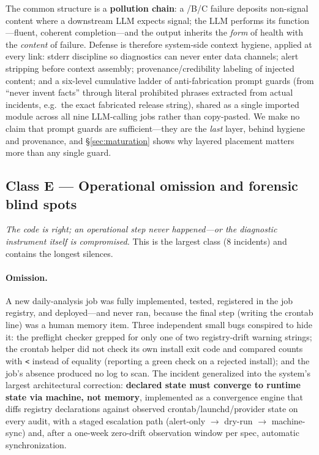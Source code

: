 \medskip
The common structure is a \textbf{pollution chain}: a /B/C
failure deposits non-signal content where a downstream LLM expects
signal; the LLM performs its function---fluent, coherent completion---and
the output inherits the \emph{form} of health with the \emph{content} of
failure. Defense is therefore system-side context hygiene, applied at
every link: stderr discipline so diagnostics can never enter data
channels; alert stripping before context assembly;
provenance/credibility labeling of injected content; and a six-level
cumulative ladder of anti-fabrication prompt guards (from ``never invent
facts'' through literal prohibited phrases extracted from actual
incidents, e.g.\ the exact fabricated release string), shared as a single
imported module across all nine LLM-calling jobs rather than copy-pasted.
We make no claim that prompt guards are sufficient---they are the
\emph{last} layer, behind hygiene and provenance, and
\S\ref{sec:maturation} shows why layered placement matters more than any
single guard.

\subsection{Class E --- Operational omission and forensic blind
spots}\label{sec:classe}

\emph{The code is right; an operational step never happened---or the
diagnostic instrument itself is compromised.} This is the largest class
(8 incidents) and contains the longest silences.

\paragraph{Omission.} A new daily-analysis job was fully implemented,
tested, registered in the job registry, and deployed---and never ran,
because the final step (writing the crontab line) was a human memory
item. Three independent small bugs conspired to hide it: the preflight
checker grepped for only one of two registry-drift warning strings; the
crontab helper did not check its own install exit code and compared
counts with \texttt{<} instead of equality (reporting a green check on a
rejected install); and the job's absence produced no log to scan. The
incident generalized into the system's largest architectural correction:
\textbf{declared state must converge to runtime state via machine, not
memory}, implemented as a convergence engine that diffs registry
declarations against observed crontab/launchd/provider state on every
audit, with a staged escalation path (alert-only $\rightarrow$ dry-run
$\rightarrow$ machine-sync) and, after a one-week zero-drift observation
window per spec, automatic synchronization.

